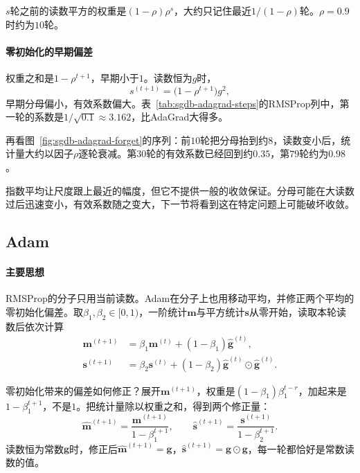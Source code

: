 $s$轮之前的读数平方的权重是$(1-\rho)\rho^{s}$，大约只记住最近$1/(1-\rho)$轮。$\rho=0.9$时约为$10$轮。

\paragraph{零初始化的早期偏差}
权重之和是$1-\rho^{t+1}$，早期小于$1$。读数恒为$g$时，
\[
 s^{(t+1)}=\bigl(1-\rho^{t+1}\bigr)g^2 ,
\]
早期分母偏小，有效系数偏大。表~\ref{tab:sgdb-adagrad-steps}的RMSProp列中，第一轮的系数是$1/\sqrt{0.1}\approx3.162$，比AdaGrad大得多。

再看图~\ref{fig:sgdb-adagrad-forget}的序列：前$10$轮把分母抬到约$8$，读数变小后，统计量大约以因子$\rho$逐轮衰减。第$30$轮的有效系数已经回到约$0.35$，第$79$轮约为$0.98$。

指数平均让尺度跟上最近的幅度，但它不提供一般的收敛保证。分母可能在大读数过后迅速变小，有效系数随之变大，下一节将看到这在特定问题上可能破坏收敛。

\subsection{Adam}
\label{sec:sgdb-adam}

\paragraph{主要思想}
RMSProp的分子只用当前读数。Adam在分子上也用移动平均，并修正两个平均的零初始化偏差。取$\beta_1,\beta_2\in[0,1)$，一阶统计$\bm{m}$与平方统计$\bm{s}$从零开始，读取本轮读数后依次计算
\begin{equation}
 \begin{aligned}
 \bm{m}^{(t+1)}&=\beta_1\bm{m}^{(t)}+(1-\beta_1)\hat{\bm g}^{(t)},\\
 \bm{s}^{(t+1)}&=\beta_2\bm{s}^{(t)}+(1-\beta_2)\hat{\bm g}^{(t)}\odot\hat{\bm g}^{(t)}.
 \end{aligned}
 \label{eq:sgdb-adam-stats}
\end{equation}

零初始化带来的偏差如何修正？展开$\bm{m}^{(t+1)}$，权重是$(1-\beta_1)\beta_1^{t-r}$，加起来是$1-\beta_1^{t+1}$，不是$1$。把统计量除以权重之和，得到两个修正量：
\begin{equation}
 \hat{\bm m}^{(t+1)}=\frac{\bm{m}^{(t+1)}}{1-\beta_1^{t+1}},\qquad
 \hat{\bm s}^{(t+1)}=\frac{\bm{s}^{(t+1)}}{1-\beta_2^{t+1}}.
 \label{eq:sgdb-adam-correction}
\end{equation}
读数恒为常数$\bm{g}$时，修正后$\hat{\bm m}^{(t+1)}=\bm{g}$，$\hat{\bm s}^{(t+1)}=\bm{g}\odot\bm{g}$，每一轮都恰好是常数读数的值。

